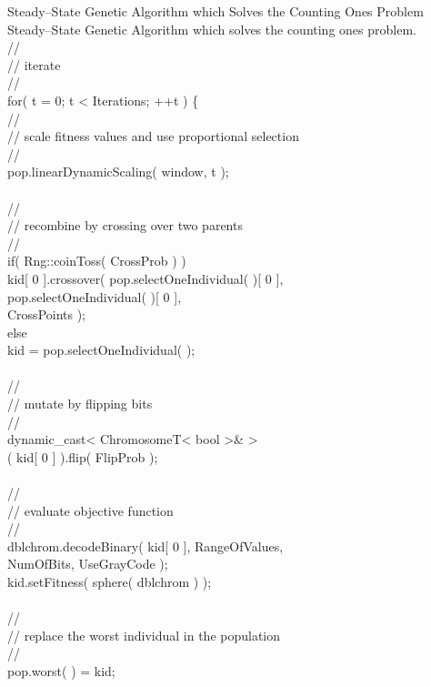 \begin{programlisting}{Steady--State Genetic Algorithm which Solves the Counting Ones Problem}{
    Steady--State Genetic Algorithm which solves the counting ones problem.}
\\
    //\\
    // iterate\\
    //\\
    for( t = 0; t < Iterations; ++t ) \{\\
        //\\
        // scale fitness values and use proportional selection\\
        //\\
        pop.linearDynamicScaling( window, t );\\
\\
        //\\
        // recombine by crossing over two parents\\
        //\\
        if( Rng::coinToss( CrossProb ) )\\
            kid[ 0 ].crossover( pop.selectOneIndividual( )[ 0 ],\\
                                pop.selectOneIndividual( )[ 0 ],\\
                                CrossPoints );\\
        else\\
            kid = pop.selectOneIndividual( );\\
\\
        //\\
        // mutate by flipping bits\\
        //\\
        dynamic_cast< ChromosomeT< bool >& >\\
            ( kid[ 0 ] ).flip( FlipProb );\\
\\
        //\\
        // evaluate objective function\\
        //\\
        dblchrom.decodeBinary( kid[ 0 ], RangeOfValues,\\
                               NumOfBits, UseGrayCode );\\
        kid.setFitness( sphere( dblchrom ) );\\
\\
        //\\
        // replace the worst individual in the population\\
        //\\
        pop.worst( ) = kid;\\
\\

\end{programlisting}
